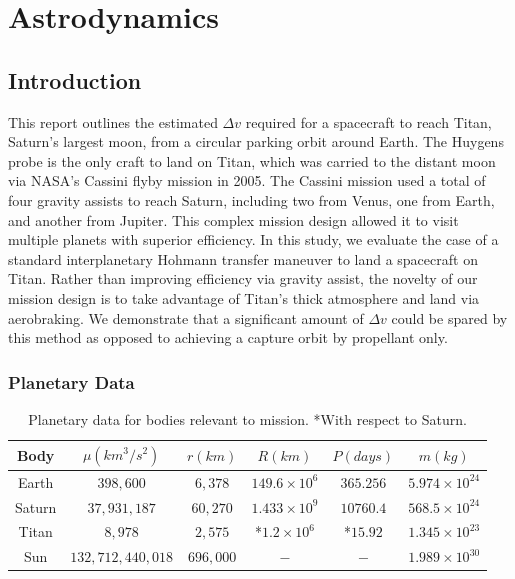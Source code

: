 \documentclass[conf]{new-aiaa}
\begin{document}
\section{Astrodynamics}

\subsection{Introduction}
This report outlines the estimated $\Delta v$ required for a spacecraft to reach Titan, Saturn's largest moon, from a circular parking orbit around Earth. The Huygens probe is the only craft to land on Titan, which was carried to the distant moon via NASA's Cassini flyby mission in 2005. The Cassini mission used a total of four gravity assists to reach Saturn, including two from Venus, one from Earth, and another from Jupiter. This complex mission design allowed it to visit multiple planets with superior efficiency. In this study, we evaluate the case of a standard interplanetary Hohmann transfer maneuver to land a spacecraft on Titan. Rather than improving efficiency via gravity assist, the novelty of our mission design is to take advantage of Titan's thick atmosphere and land via aerobraking. We demonstrate that a significant amount of $\Delta v$ could be spared by this method as opposed to achieving a capture orbit by propellant only. 

\subsubsection{Planetary Data}

\begin{table}[htbp]
\centering
\begin{tabular}{| c c c c c c |}
\hline
Body & $\mu(km^3/s^2)$ & $r (km)$ & $R (km)$ & $P (days)$ & $m (kg)$ \\
\hline
Earth & $398,600$ & $6,378$ & $149.6 \times 10^6$ & $365.256$ & $5.974 \times 10^{24}$ \\
Saturn & $37,931,187$ & $60,270$ & $1.433 \times 10^9$ & $10760.4$ & $568.5 \times 10^{24}$ \\
Titan & $8,978$ & $2,575$ & *$1.2 \times 10^6$ & *$15.92$ & $1.345 \times 10^{23}$ \\
Sun & $132,712,440,018$ & $696,000$ & $-$ & $-$ & $1.989 \times 10^{30}$ \\
\hline
\end{tabular}
\caption{\label{tab:widgets}Planetary data for bodies relevant to mission. *With respect to Saturn.}
\end{table}
\end{document}
